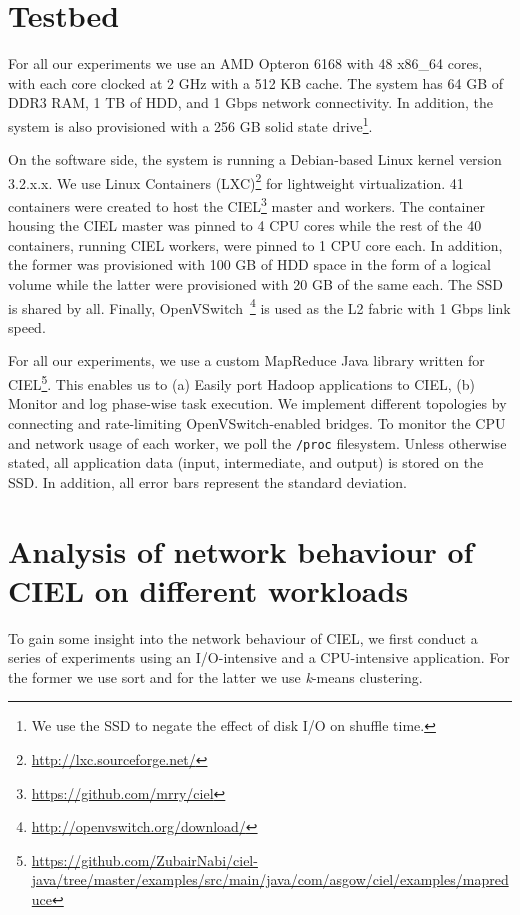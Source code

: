 \documentclass[a4paper,12pt,twoside,openright]{report}
\begin{document}
\section{Testbed}
For all our experiments we use an AMD Opteron 6168 with 48 x86\_64 cores, with
each core clocked at 2 GHz with a 512 KB cache. The system has 64 GB of DDR3
RAM, 1 TB of HDD, and 1 Gbps network connectivity. In addition, the system is
also provisioned with a 256 GB solid state drive\footnote{We use the SSD to
negate the effect of disk I/O on shuffle time.}.

On the software side, the system is running a Debian-based Linux kernel version
3.2.x.x. We use Linux Containers
(LXC)\footnote{\url{http://lxc.sourceforge.net/}} for lightweight
virtualization. 41 containers were created to host the
CIEL\footnote{\url{https://github.com/mrry/ciel}} master and workers. The
container housing the CIEL master was pinned to 4 CPU cores while the rest of
the 40 containers, running CIEL workers, were pinned to 1 CPU core each. In
addition, the former was provisioned with 100 GB of HDD space in the form of a
logical volume while the latter were provisioned with 20 GB of the same each.
The SSD is shared by all. Finally,
OpenVSwitch~\cite{Pfaff:2009:ENI}\footnote{\url{http://openvswitch.org/download/}}
is used as the L2 fabric with 1 Gbps link speed.

For all our experiments, we use a custom MapReduce Java library written for
CIEL\footnote{\url{https://github.com/ZubairNabi/ciel-java/tree/master/examples/src/main/java/com/asgow/ciel/examples/mapreduce}}.
This enables us to (a) Easily port Hadoop applications to CIEL, (b) Monitor and
log phase-wise task execution. We implement different topologies by connecting
and rate-limiting OpenVSwitch-enabled bridges. To monitor the CPU and network
usage of each worker, we poll the \texttt{/proc} filesystem. Unless otherwise
stated, all application data (input, intermediate, and output) is stored on the
SSD. In addition, all error bars represent the standard deviation.

\section{Analysis of network behaviour of CIEL on different workloads}
To gain some insight into the network behaviour of CIEL, we first conduct a
series of experiments using an I/O-intensive and a CPU-intensive application.
For the former we use sort and for the latter we use \emph{k}-means clustering.
\end{document}
